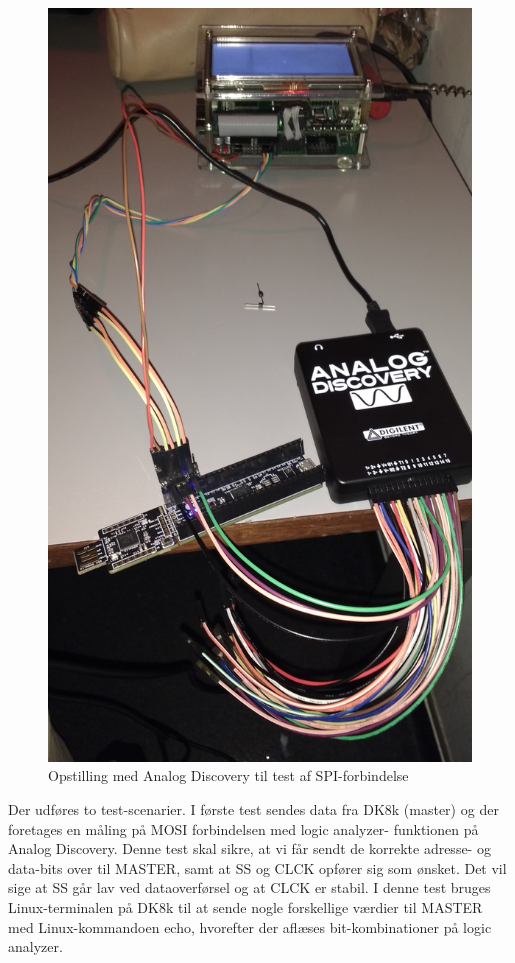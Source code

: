 \begin{figure}[H]
	\centering
\includegraphics[scale=0.1]{Screenshots/Test_analog}
\caption{Opstilling med Analog Discovery til test af SPI-forbindelse} 
\end{figure}

Der udføres to test-scenarier. I første test sendes data fra DK8k (master) og der foretages en måling på MOSI forbindelsen med logic analyzer-
funktionen på Analog Discovery. Denne test skal sikre, at vi får sendt de korrekte adresse- og data-bits over til MASTER, samt at SS og CLCK opfører sig 
som ønsket. Det vil sige at SS går lav ved dataoverførsel og at CLCK er stabil. I denne test bruges Linux-terminalen på DK8k til at sende nogle forskellige
værdier til MASTER med Linux-kommandoen echo, hvorefter der aflæses bit-kombinationer på logic analyzer.

